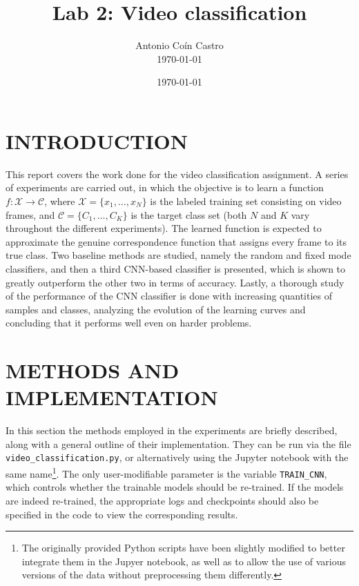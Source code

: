 \documentclass[letterpaper, 10 pt, conference]{IEEEtran}
\title{\LARGE \bf Lab 2: Video classification}
\author{Antonio Coín Castro\\ \today}
\date{\today}
\begin{document}
\maketitle
\thispagestyle{plain} %
\pagestyle{plain}


\section{INTRODUCTION}
This report covers the work done for the video classification assignment. A series of experiments are carried out, in which the objective is to learn a function $f:\mathcal X\to \mathcal C$, where $\mathcal X=\{x_1,\dots, x_N\}$ is the labeled training set consisting on video frames, and $\mathcal C = \{C_1,\dots, C_K\}$ is the target class set (both $N$ and $K$ vary throughout the different experiments). The learned function is expected to approximate the genuine correspondence function that assigns every frame to its true class.
Two baseline methods are studied, namely the random and fixed mode classifiers, and then a third CNN-based classifier is presented, which is shown to greatly outperform the other two in terms of accuracy. Lastly, a thorough study of the performance of the CNN classifier is done with increasing quantities of samples and classes, analyzing the evolution of the learning curves and concluding that it performs well even on harder problems.


\section{METHODS AND IMPLEMENTATION}
\label{sec:method}

In this section the methods employed in the experiments are briefly described, along with a general outline of their implementation. They can be run via the file \texttt{video\_classification.py}, or alternatively using the Jupyter notebook with the same name\footnote{The originally provided Python scripts have been slightly modified to better integrate them in the Jupyer notebook, as well as to allow the use of various versions of the data without preprocessing them differently.}. The only user-modifiable parameter is the variable \texttt{TRAIN\_CNN}, which controls whether the trainable models should be re-trained. If the models are indeed re-trained, the appropriate logs and checkpoints should also be specified in the code to view the corresponding results.
\end{document}
